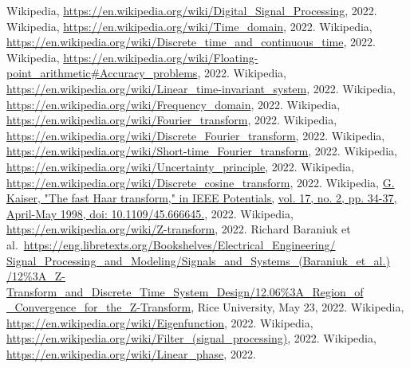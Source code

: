 \clearpage
{}
\begin{thebibliography}{9}
        \footnotesize{
         Wikipedia, \underline{https://en.wikipedia.org/wiki/Digital\_Signal\_Processing}, 2022.
         Wikipedia, \underline{https://en.wikipedia.org/wiki/Time\_domain}, 2022.
         Wikipedia, \underline{https://en.wikipedia.org/wiki/Discrete\_time\_and\_continuous\_time}, 2022.
         Wikipedia, \underline{https://en.wikipedia.org/wiki/Floating-point\_arithmetic\#Accuracy\_problems}, 2022.
         Wikipedia, \underline{https://en.wikipedia.org/wiki/Linear\_time-invariant\_system}, 2022.
         Wikipedia, \underline{https://en.wikipedia.org/wiki/Frequency\_domain}, 2022.
         Wikipedia, \underline{https://en.wikipedia.org/wiki/Fourier\_transform}, 2022.
         Wikipedia, \underline{https://en.wikipedia.org/wiki/Discrete\_Fourier\_transform}, 2022.
         Wikipedia, \underline{https://en.wikipedia.org/wiki/Short-time\_Fourier\_transform}, 2022.
         Wikipedia, \underline{https://en.wikipedia.org/wiki/Uncertainty\_principle}, 2022.
         Wikipedia, \underline{https://en.wikipedia.org/wiki/Discrete\_cosine\_transform}, 2022.
         Wikipedia, \underline{G. Kaiser, "The fast Haar transform," in IEEE Potentials,} \underline{vol. 17, no. 2, pp. 34-37, April-May 1998, doi: 10.1109/45.666645.}, 2022.
         Wikipedia, \underline{https://en.wikipedia.org/wiki/Z-transform}, 2022.
         Richard Baraniuk et al.\ \underline{https://eng.libretexts.org/Bookshelves/Electrical\_Engineering/} \underline{Signal\_Processing\_and\_Modeling/Signals\_and\_Systems\_(Baraniuk\_et\_al.)} \underline{/12\%3A\_Z-Transform\_and\_Discrete\_Time\_System\_Design/12.06\%3A\_Region\_of} \underline{\_Convergence\_for\_the\_Z-Transform}, Rice University, May 23, 2022.
         Wikipedia, \underline{https://en.wikipedia.org/wiki/Eigenfunction}, 2022.
         Wikipedia, \underline{https://en.wikipedia.org/wiki/Filter\_(signal\_processing)}, 2022.
         Wikipedia, \underline{https://en.wikipedia.org/wiki/Linear\_phase}, 2022.
        }
\end{thebibliography}


